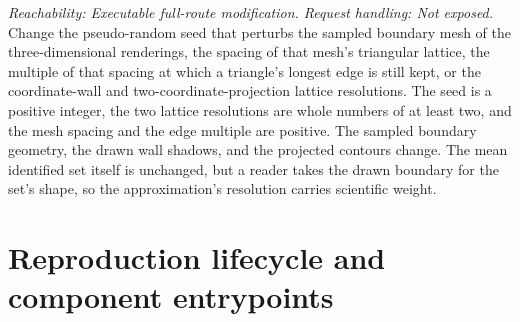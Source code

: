\documentclass[11pt]{article}
\begin{document}
\begin{description}[style=nextline]
\item[Region-figure mesh seed and resolution.]
\emph{Reachability: Executable full-route modification. Request handling: Not exposed.}
Change the pseudo-random seed that perturbs the sampled boundary mesh of the three-dimensional
renderings, the spacing of that mesh's triangular lattice, the multiple of that spacing at which a
triangle's longest edge is still kept, or the coordinate-wall and two-coordinate-projection lattice
resolutions. The seed is a positive integer, the two lattice resolutions are whole numbers of at
least two, and the mesh spacing and the edge multiple are positive. The sampled boundary geometry, the drawn wall shadows, and the
projected contours change. The mean identified set itself is unchanged, but a
reader takes the drawn boundary for the set's shape, so the approximation's resolution carries
scientific weight.
\end{description}

\section{Reproduction lifecycle and component entrypoints}
\end{document}
